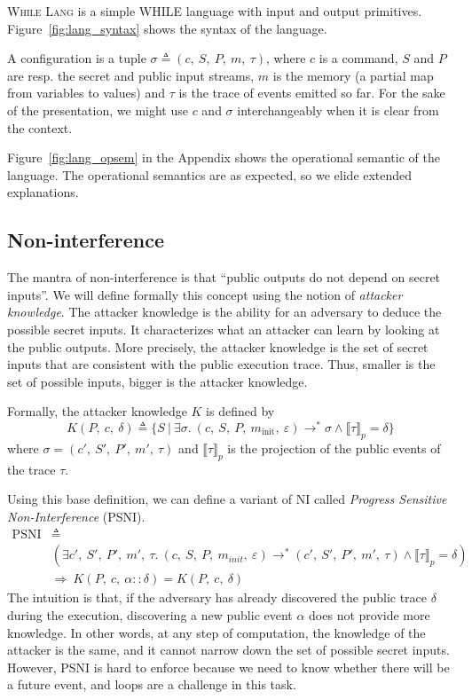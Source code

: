 \documentclass[10pt]{article}
\newcommand{\conf}{\sigma}
\newcommand{\exectrans}[2] { #1 \rightarrow^{*} #2 }
\newcommand{\whilelang}{\textsc{While Lang} }
\newcommand{\pproj}[1]{\llbracket #1 \rrbracket_{p}}
\begin{document}
\whilelang is a simple WHILE language with input and output primitives. Figure~\ref{fig:lang_syntax}
shows the syntax of the language.



A configuration is a tuple $\conf \triangleq (c,~S,~P,~m,~\tau)$, where $c$ is a command, $S$ and
$P$ are resp. the secret and public input streams, $m$ is the memory (a partial map
from variables to values) and $\tau$ is the trace of events emitted so far.
For the sake of the presentation, we might use $c$ and $\conf$ interchangeably when it is clear from
the context.

Figure~\ref{fig:lang_opsem} in the Appendix shows the operational semantic of the language. The operational semantics
are as expected, so we elide extended explanations.

\subsection{Non-interference}%
\label{subsec:ni}

The mantra of non-interference is that ``public outputs do not depend on secret inputs''.
We will define formally this concept using the notion of \emph{attacker knowledge}. The attacker
knowledge is the ability for an adversary to deduce the possible secret inputs. It characterizes
what an attacker can learn by looking at the public outputs.
More precisely, the attacker knowledge is the set of secret inputs that are consistent with the
public execution trace. Thus, smaller is the set of possible inputs, bigger is the attacker
knowledge.

Formally, the attacker knowledge $K$ is defined by
\[
  K(P,~c,~\delta) \triangleq
  \{ S ~|~ \exists \conf.\
  \exectrans{(c,~S,~P,~m_{\mathrm{init}},~\varepsilon)}{\conf}
  \wedge
  \pproj{\tau} = \delta
  \}
\]
where $\conf = (c',~S',~P',~m',~\tau)$ and $\pproj{\tau}$ is the projection of the public events of
the trace $\tau$.

Using this base definition, we can define a variant of NI called \emph{Progress Sensitive
  Non-Interference} (PSNI).
\begin{align*}
  \mathrm{PSNI} &\triangleq \\
  &(\exists c',~S',~P',~m',~\tau.\
  \exectrans{(c,~S,~P,~m_{init},~\varepsilon)}{(c',~S',~P',~m',~\tau)}
  \wedge
  \pproj{\tau} = \delta) \\
  &\Rightarrow
  \ K(P,~c,~\alpha::\delta) = K(P,~c,~\delta)
\end{align*}
The intuition is that, if the adversary has already discovered the public trace $\delta$ during the
execution, discovering a new public event $\alpha$ does not provide more knowledge.
In other words, at any step of computation, the knowledge of the attacker is the same, and it cannot
narrow down the set of possible secret inputs.
However, PSNI is hard to enforce because we need to know whether there will be a future event, and
loops are a challenge in this task.
\end{document}
